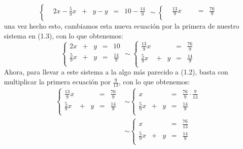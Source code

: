 \documentclass[12pt]{report}
\theoremstyle{largebreak}
\begin{document}
    \begin{equation*}
        \left\{
            \begin{array}{cccccl}
                & 2x-\frac{5}{9}x & + & y-y & = & 10-\frac{14}{9} \\
            \end{array}
        \right.
        \sim
        \left\{
            \begin{array}{cccccl}
                & \frac{13}{9}x &  &  & = & \frac{76}{9} \\
            \end{array}
        \right.
    \end{equation*}
    una vez hecho esto, cambiamos esta nueva ecuación por la primera de nuestro sistema en (1.3), con lo que obtenemos:
    \begin{equation*}
        \left\{
            \begin{array}{ccccl}
                2x & + & y & = & 10 \\
                \frac{5}{9}x & + & y & = & \frac{14}{9} \\
            \end{array}
        \right.
        \sim
        \left\{
            \begin{array}{ccccl}
                \frac{13}{9}x &  &  & = & \frac{76}{9} \\
                \frac{5}{9}x & + & y & = & \frac{14}{9} \\
            \end{array}
        \right.
    \end{equation*}
    Ahora, para llevar a este sistema a la algo más parecido a (1.2), basta con multiplicar la primera ecuación por $\frac{9}{13}$, con lo que obtenemos:
    \begin{equation*}
        \begin{split}
            \left\{
            \begin{array}{ccccl}
                \frac{13}{9}x &  &  & = & \frac{76}{9} \\
                \frac{5}{9}x & + & y & = & \frac{14}{9} \\
            \end{array}
        \right.
        &\sim
        \left\{
            \begin{array}{ccccl}
                x &  &  & = & \frac{76}{9}\cdot\frac{9}{13} \\
                \frac{5}{9}x & + & y & = & \frac{14}{9} \\
            \end{array}
        \right.\\
        &\sim
        \left\{
            \begin{array}{ccccl}
                x &  &  & = & \frac{76}{13} \\
                \frac{5}{9}x & + & y & = & \frac{14}{9} \\
            \end{array}
        \right.\\
        \end{split}
    \end{equation*}
\end{document}
